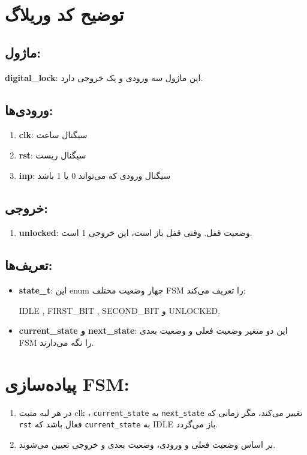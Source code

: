 \section*{توضیح کد وریلاگ}

\subsection*{ماژول:}
\textbf{digital\_lock}: این ماژول سه ورودی و یک خروجی دارد.

\subsection*{ورودی‌ها:}
\begin{enumerate}
	\item \textbf{clk}: سیگنال ساعت
	\item \textbf{rst}: سیگنال ریست
	\item \textbf{inp}: سیگنال ورودی که می‌تواند 0 یا 1 باشد
\end{enumerate}

\subsection*{خروجی:}

\begin{enumerate}
	\item \textbf{unlocked}: وضعیت قفل. وقتی قفل باز است، این خروجی 1 است.
\end{enumerate}

\subsection*{تعریف‌ها:}
\begin{itemize}
	\item \textbf{state\_t}:
	این enum چهار وضعیت مختلف FSM را تعریف می‌کند:
	
	IDLE , FIRST\_BIT , SECOND\_BIT و UNLOCKED.
	\item \textbf{current\_state و next\_state}: این دو متغیر وضعیت فعلی و وضعیت بعدی FSM را نگه می‌دارند.
\end{itemize}

\section*{پیاده‌سازی FSM:}
\begin{enumerate}
	\item در هر لبه مثبت clk ، \texttt{current\_state} به \texttt{next\_state} تغییر می‌کند، مگر زمانی که \texttt{rst} فعال باشد که \texttt{current\_state} به IDLE باز می‌گردد.
	\item بر اساس وضعیت فعلی و ورودی، وضعیت بعدی و خروجی تعیین می‌شوند.
\end{enumerate}

